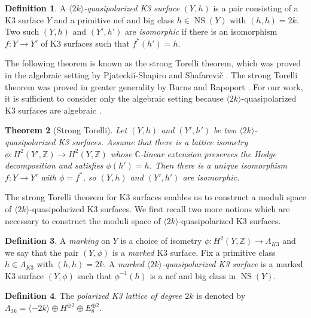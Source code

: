 \documentclass[a4paper]{amsart}
\theoremstyle{definition}
\newtheorem{defn}{Definition}[section]
\theoremstyle{plain}
\newtheorem{theorem}[defn]{Theorem}
\theoremstyle{remark}
\newcommand{\Z}{\mathbb{Z}}
\newcommand{\C}{\mathbb{C}}
\begin{document}
\begin{defn}
A \emph{$\langle 2k \rangle$-quasipolarized K3 surface} $(Y,h)$ is a pair consisting of a K3 surface $Y$ and a primitive nef and big class $h \in \operatorname{NS}(Y)$ with $(h,h)=2k$. Two such $(Y,h)$ and $(Y',h')$ are \emph{isomorphic} if there is an isomorphism $f:Y\rightarrow Y'$ of K3 surfaces such that $f^*(h')=h$.
\end{defn}

The following theorem is known as the strong Torelli theorem, which was proved in the algebraic setting by Pjatecki{\u i}-Shapiro
and Shafarevi{\v c} \cite[p.551]{PSS71}. The strong Torelli theorem was proved in greater generality by Burns and Rapoport \cite{BurnsRapoport}. For our work, it is sufficient to consider only the algebraic setting because $\langle 2k\rangle$-quasipolarized K3 surfaces are algebraic \cite[Remark 2]{HarThom15}.

\begin{theorem}[Strong Torelli]\cite{PSS71,BurnsRapoport}\label{hodge isometry}
Let $(Y,h)$ and $(Y',h')$ be two $\langle 2k \rangle$-quasipolarized K3 surfaces. Assume that there is a lattice isometry $\phi:H^2(Y',\Z)\rightarrow H^2(Y,\Z)$ whose $\C$-linear extension preserves the Hodge decomposition and satisfies $\phi(h')=h$. Then there is a unique isomorphism $f:Y\rightarrow Y'$ with $\phi=f^*$, so $(Y,h)$ and $(Y',h')$ are isomorphic.
\end{theorem}

The strong Torelli theorem for K3 surfaces enables us to construct a moduli space of $\langle 2k \rangle$-quasipolarized K3 surfaces. We first recall two more notions which are necessary to construct the moduli space of $\langle 2k \rangle$-quasipolarized K3 surfaces.

\begin{defn}
A \emph{marking} on $Y$ is a choice of isometry $\phi:H^2(Y,\Z)\rightarrow \Lambda_{K3}$ and we say that the pair $(Y,\phi)$ is a \emph{marked} K3 surface. Fix a primitive class $h\in \Lambda_{K3}$ with $(h,h)=2k$. A \emph{marked $\langle 2k \rangle$-quasipolarized K3 surface} is a marked K3 surface $(Y,\phi)$ such that $\phi^{-1}(h)$ is a nef and big class in $\operatorname{NS}(Y)$.
\end{defn}

\begin{defn}
The \emph{polarized K3 lattice of degree $2k$} is denoted by $\Lambda_{2k}=\langle -2k\rangle \oplus H^{\oplus 2}\oplus E_8^{\oplus 2}$.
\end{defn}
\end{document}
